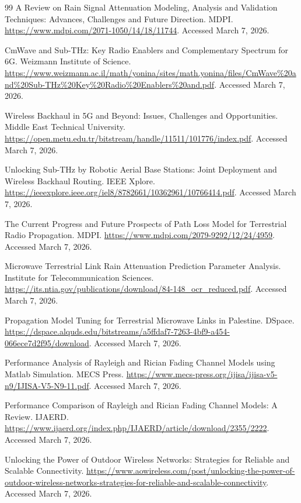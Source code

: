 \documentclass[11pt,a4paper]{article}
\begin{document}
\begin{thebibliography}{99}
 A Review on Rain Signal Attenuation Modeling, Analysis and Validation Techniques: Advances, Challenges and Future Direction. MDPI. \url{https://www.mdpi.com/2071-1050/14/18/11744}. Accessed March 7, 2026.

 CmWave and Sub-THz: Key Radio Enablers and Complementary Spectrum for 6G. Weizmann Institute of Science. \url{https://www.weizmann.ac.il/math/yonina/sites/math.yonina/files/CmWave\%20and\%20Sub-THz\%20Key\%20Radio\%20Enablers\%20and.pdf}. Accessed March 7, 2026.

 Wireless Backhaul in 5G and Beyond: Issues, Challenges and Opportunities. Middle East Technical University. \url{https://open.metu.edu.tr/bitstream/handle/11511/101776/index.pdf}. Accessed March 7, 2026.

 Unlocking Sub-THz by Robotic Aerial Base Stations: Joint Deployment and Wireless Backhaul Routing. IEEE Xplore. \url{https://ieeexplore.ieee.org/iel8/8782661/10362961/10766414.pdf}. Accessed March 7, 2026.

 The Current Progress and Future Prospects of Path Loss Model for Terrestrial Radio Propagation. MDPI. \url{https://www.mdpi.com/2079-9292/12/24/4959}. Accessed March 7, 2026.

 Microwave Terrestrial Link Rain Attenuation Prediction Parameter Analysis. Institute for Telecommunication Sciences. \url{https://its.ntia.gov/publications/download/84-148_ocr_reduced.pdf}. Accessed March 7, 2026.

 Propagation Model Tuning for Terrestrial Microwave Links in Palestine. DSpace. \url{https://dspace.alquds.edu/bitstreams/a5ffdaf7-7263-4bf9-a454-066ece7d2f95/download}. Accessed March 7, 2026.

 Performance Analysis of Rayleigh and Rician Fading Channel Models using Matlab Simulation. MECS Press. \url{https://www.mecs-press.org/ijisa/ijisa-v5-n9/IJISA-V5-N9-11.pdf}. Accessed March 7, 2026.

 Performance Comparison of Rayleigh and Rician Fading Channel Models: A Review. IJAERD. \url{https://www.ijaerd.org/index.php/IJAERD/article/download/2355/2222}. Accessed March 7, 2026.

 Unlocking the Power of Outdoor Wireless Networks: Strategies for Reliable and Scalable Connectivity. \url{https://www.aowireless.com/post/unlocking-the-power-of-outdoor-wireless-networks-strategies-for-reliable-and-scalable-connectivity}. Accessed March 7, 2026.


\end{thebibliography}
\end{document}
